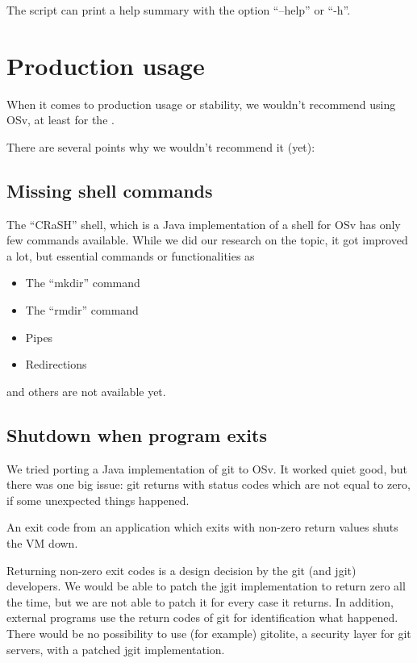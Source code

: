     The script can print a help summary with the option ``--help'' or ``-h''.

\chapter{Production usage}

    When it comes to production usage or stability, we wouldn't recommend using
    OSv, at least for the \HFU.

    There are several points why we wouldn't recommend it (yet):

    \section{Missing shell commands}

        The ``CRaSH'' shell, which is a Java implementation of a shell for OSv
        has only few commands available. While we did our research on the topic,
        it got improved a lot, but essential commands or functionalities as

            \begin{itemize}
                \item The ``mkdir'' command
                \item The ``rmdir'' command
                \item Pipes
                \item Redirections
            \end{itemize}

        and others are not available yet.

    \section{Shutdown when program exits}

        We tried porting a Java implementation of git to OSv. It worked quiet
        good, but there was one big issue: git returns with status codes which
        are not equal to zero, if some unexpected things happened.

        An exit code from an application which exits with non-zero return values
        shuts the VM down.

        Returning non-zero exit codes is a design decision by the git (and jgit)
        developers. We would be
        able to patch the jgit implementation to return zero all the time, but
        we are not able to patch it for every case it returns. In addition,
        external programs use the return codes of git for identification what
        happened. There would be no possibility to use (for example) gitolite, a
        security layer for git servers, with a patched jgit implementation.

